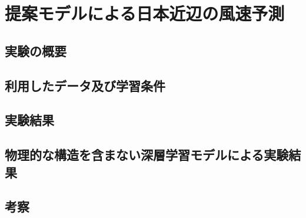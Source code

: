 \chapter{提案モデルによる日本近辺の風速予測\label{chap:experiments}}
\section{実験の概要}

\section{利用したデータ及び学習条件}

\section{実験結果}

\section{物理的な構造を含まない深層学習モデルによる実験結果}

\section{考察}